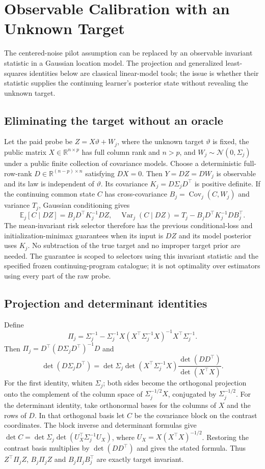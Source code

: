 \section{Observable Calibration with an Unknown Target}
The centered-noise pilot assumption can be replaced by an observable invariant statistic in a Gaussian location model.
The projection and generalized least-squares identities below are classical linear-model tools; the issue is whether their statistic supplies the continuing learner's posterior state without revealing the unknown target.

\subsection{Eliminating the target without an oracle}
Let the paid probe be $Z=X\vartheta+W_j$, where the unknown target $\vartheta$ is fixed, the public matrix $X\in\mathbb R^{n\times p}$ has full column rank and $n>p$, and $W_j\sim\mathcal N(0,\Sigma_j)$ under a public finite collection of covariance models.
Choose a deterministic full-row-rank $D\in\mathbb R^{(n-p)\times n}$ satisfying $DX=0$.
Then $Y=DZ=DW_j$ is observable and its law is independent of $\vartheta$.
Its covariance $K_j=D\Sigma_jD^\top$ is positive definite.
If the continuing common state $C$ has cross-covariance $B_j=\operatorname{Cov}_j(C,W_j)$ and variance $T_j$, Gaussian conditioning gives
\[
\mathbb E_j[C\mid DZ]=B_jD^\top K_j^{-1}DZ,\quad
\operatorname{Var}_j(C\mid DZ)=T_j-B_jD^\top K_j^{-1}DB_j^\top.
\]
The mean-invariant risk selector therefore has the previous conditional-loss and initialization-minimax guarantees when its input is $DZ$ and its model posterior uses $K_j$.
No subtraction of the true target and no improper target prior are needed.
The guarantee is scoped to selectors using this invariant statistic and the specified frozen continuing-program catalogue; it is not optimality over estimators using every part of the raw probe.

\subsection{Projection and determinant identities}
Define
\[
\Pi_j=\Sigma_j^{-1}-\Sigma_j^{-1}X
(X^\top\Sigma_j^{-1}X)^{-1}X^\top\Sigma_j^{-1}.
\]
Then $\Pi_j=D^\top(D\Sigma_jD^\top)^{-1}D$ and
\[
\det(D\Sigma_jD^\top)=
\det\Sigma_j\det(X^\top\Sigma_j^{-1}X)
\frac{\det(DD^\top)}{\det(X^\top X)}.
\]
For the first identity, whiten $\Sigma_j$; both sides become the orthogonal projection onto the complement of the column space of $\Sigma_j^{-1/2}X$, conjugated by $\Sigma_j^{-1/2}$.
For the determinant identity, take orthonormal bases for the columns of $X$ and the rows of $D$.
In that orthogonal basis let $C$ be the covariance block on the contrast coordinates.
The block inverse and determinant formulas give $\det C=\det\Sigma_j\det(U_X^\top\Sigma_j^{-1}U_X)$, where $U_X=X(X^\top X)^{-1/2}$.
Restoring the contrast basis multiplies by $\det(DD^\top)$ and gives the stated formula.
Thus $Z^\top\Pi_jZ$, $B_j\Pi_jZ$ and $B_j\Pi_jB_j^\top$ are exactly target invariant.

